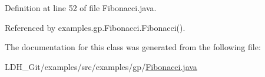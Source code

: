 Definition at line 52 of file Fibonacci.\-java.



Referenced by examples.\-gp.\-Fibonacci.\-Fibonacci().



The documentation for this class was generated from the following file\-:\begin{DoxyCompactItemize}
\item 
L\-D\-H\-\_\-\-Git/examples/src/examples/gp/\hyperlink{_fibonacci_8java}{Fibonacci.\-java}\end{DoxyCompactItemize}
